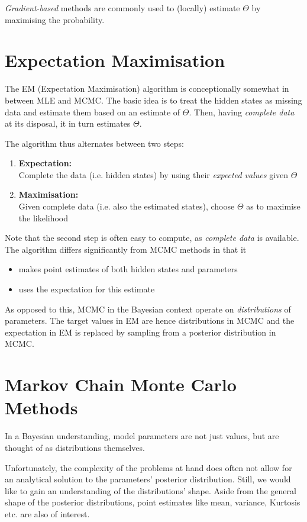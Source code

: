 \textit{Gradient-based} methods are commonly used to (locally) estimate $\Theta$ by maximising the probability. 


\section{Expectation Maximisation}

The EM (Expectation Maximisation) algorithm is conceptionally somewhat in between MLE and MCMC. 
The basic idea is to treat the hidden states as missing data and estimate them based on an estimate of $\Theta$. Then, having \textit{complete data} at its disposal, it in turn estimates $\Theta$. 

The algorithm thus alternates between two steps: 
\begin{enumerate}
	\item \textbf{Expectation:} \\
		  Complete the data (i.e. hidden states) by using their \textit{expected values} given $\Theta$
	\item \textbf{Maximisation:} \\
		  Given complete data (i.e. also the estimated states), choose $\Theta$ as to maximise the likelihood 
\end{enumerate} 

Note that the second step is often easy to compute, as \textit{complete data} is available. The algorithm differs significantly from MCMC methods in that it 
\begin{itemize}
	\item makes point estimates of both hidden states and parameters
	\item uses the expectation for this estimate
\end{itemize}

As opposed to this, MCMC in the Bayesian context operate on \textit{distributions} of parameters. The target values in EM are hence distributions in MCMC and the expectation in EM is replaced by sampling from a posterior distribution in MCMC. 


\section{Markov Chain Monte Carlo Methods}

	In a Bayesian understanding, model parameters are not just values, but are thought of as distributions themselves.
	
	Unfortunately, the complexity of the problems at hand does often not allow for an analytical solution to the parameters' posterior distribution. 
	Still, we would like to gain an understanding of the distributions' shape. Aside from the general shape of the posterior distributions, point estimates like mean, variance, Kurtosis etc. are also of interest. 
	
